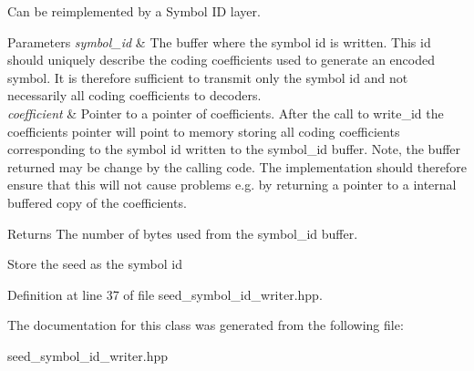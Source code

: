 Can be reimplemented by a Symbol I\-D layer. 


\begin{DoxyParams}{Parameters}
{\em symbol\-\_\-id} & The buffer where the symbol id is written. This id should uniquely describe the coding coefficients used to generate an encoded symbol. It is therefore sufficient to transmit only the symbol id and not necessarily all coding coefficients to decoders. \\
\hline
{\em coefficient} & Pointer to a pointer of coefficients. After the call to write\-\_\-id the coefficients pointer will point to memory storing all coding coefficients corresponding to the symbol id written to the symbol\-\_\-id buffer. Note, the buffer returned may be change by the calling code. The implementation should therefore ensure that this will not cause problems e.\-g. by returning a pointer to a internal buffered copy of the coefficients.\\
\hline
\end{DoxyParams}
\begin{DoxyReturn}{Returns}
The number of bytes used from the symbol\-\_\-id buffer. 
\end{DoxyReturn}
Store the seed as the symbol id 

Definition at line 37 of file seed\-\_\-symbol\-\_\-id\-\_\-writer.\-hpp.



The documentation for this class was generated from the following file\-:\begin{DoxyCompactItemize}
\item 
seed\-\_\-symbol\-\_\-id\-\_\-writer.\-hpp\end{DoxyCompactItemize}
